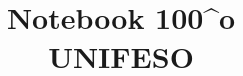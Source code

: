 \documentclass[oneside]{book}
\author{}
\title{Notebook 100\^{}o\\UNIFESO}
\begin{document}
\begin{otherlanguage}{brazil}

\maketitle
\tableofcontents










\end{otherlanguage}
\end{document}
